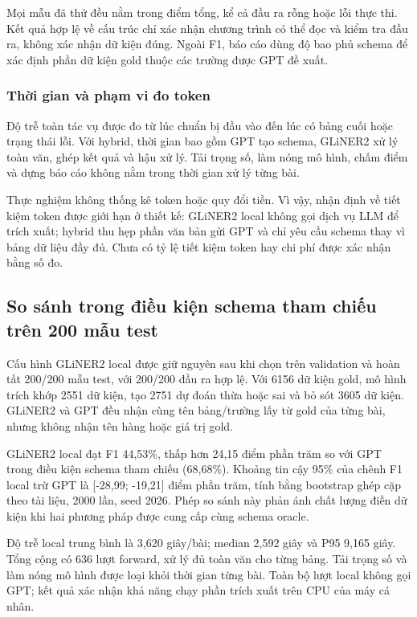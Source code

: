 Mọi mẫu đã thử đều nằm trong điểm tổng, kể cả đầu ra rỗng hoặc lỗi thực thi. Kết quả hợp lệ về cấu trúc chỉ xác nhận chương trình có thể đọc và kiểm tra đầu ra, không xác nhận dữ kiện đúng. Ngoài F1, báo cáo dùng độ bao phủ schema để xác định phần dữ kiện gold thuộc các trường được GPT đề xuất.

\subsubsection{Thời gian và phạm vi đo token}
Độ trễ toàn tác vụ được đo từ lúc chuẩn bị đầu vào đến lúc có bảng cuối hoặc trạng thái lỗi. Với hybrid, thời gian bao gồm GPT tạo schema, GLiNER2 xử lý toàn văn, ghép kết quả và hậu xử lý. Tải trọng số, làm nóng mô hình, chấm điểm và dựng báo cáo không nằm trong thời gian xử lý từng bài.

Thực nghiệm không thống kê token hoặc quy đổi tiền. Vì vậy, nhận định về tiết kiệm token được giới hạn ở thiết kế: GLiNER2 local không gọi dịch vụ LLM để trích xuất; hybrid thu hẹp phần văn bản gửi GPT và chỉ yêu cầu schema thay vì bảng dữ liệu đầy đủ. Chưa có tỷ lệ tiết kiệm token hay chi phí được xác nhận bằng số đo.

\subsection{So sánh trong điều kiện schema tham chiếu trên 200 mẫu test}
Cấu hình GLiNER2 local được giữ nguyên sau khi chọn trên validation và hoàn tất 200/200 mẫu test, với 200/200 đầu ra hợp lệ. Với 6156 dữ kiện gold, mô hình trích khớp 2551 dữ kiện, tạo 2751 dự đoán thừa hoặc sai và bỏ sót 3605 dữ kiện. GLiNER2 và GPT đều nhận cùng tên bảng/trường lấy từ gold của từng bài, nhưng không nhận tên hàng hoặc giá trị gold.

\begin{table}[H]
\centering

\caption{So sánh GLiNER2 local và GPT trong điều kiện oracle schema tham chiếu trên cùng 200 mẫu test.}
\label{tab:local}
\end{table}

GLiNER2 local đạt F1 44,53\%, thấp hơn 24,15 điểm phần trăm so với GPT trong điều kiện schema tham chiếu (68,68\%). Khoảng tin cậy 95\% của chênh F1 local trừ GPT là [-28,99; -19,21] điểm phần trăm, tính bằng bootstrap ghép cặp theo tài liệu, 2000 lần, seed 2026. Phép so sánh này phản ánh chất lượng điền dữ kiện khi hai phương pháp được cung cấp cùng schema oracle.

Độ trễ local trung bình là 3,620 giây/bài; median 2,592 giây và P95 9,165 giây. Tổng cộng có 636 lượt forward, xử lý đủ toàn văn cho từng bảng. Tải trọng số và làm nóng mô hình được loại khỏi thời gian từng bài. Toàn bộ lượt local không gọi GPT; kết quả xác nhận khả năng chạy phần trích xuất trên CPU của máy cá nhân.

